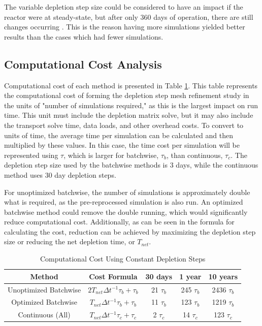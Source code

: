 The variable depletion step size could be considered to have an impact if the reactor were at steady-state, but after only 360 days of operation, there are still changes occurring \cite{rykhlevskii_advanced_2018}. This is the reason having more simulations yielded better results than the cases which had fewer simulations.

\subsection{Computational Cost Analysis}

Computational cost of each method is presented in Table \ref{tab:comp-cost-methods-1}.
This table represents the computational cost of forming the depletion step mesh refinement study in the units of "number of simulations required," as this is the largest impact on run time. This unit must include the depletion matrix solve, but it may also include the transport solve time, data loads, and other overhead costs. To convert to units of time, the average time per simulation can be calculated and then multiplied by these values. In this case, the time cost per simulation will be represented using $\tau$, which is larger for batchwise, $\tau_{b}$, than continuous, $\tau_{c}$.
The depletion step size used by the batchwise methods is 3 days, while the continuous method uses 30 day depletion steps.

For unoptimized batchwise, the number of simulations is approximately double what is required, as the pre-reprocessed simulation is also run. An optimized batchwise method could remove the double running, which would significantly reduce computational cost. Additionally, as can be seen in the formula for calculating the cost, reduction can be achieved by maximizing the depletion step size or reducing the net depletion time, or $T_{net}$.

\begin{table}[H]
\renewcommand{\arraystretch}{1.25}
\caption{Computational Cost Using Constant Depletion Steps}
\label{tab:comp-cost-methods-1}
\begin{center}
\begin{tabular}{ c | c | c | c | c }
 \hline
 Method & Cost Formula & 30 days & 1 year & 10 years\\
 \hline
 \hline
 Unoptimized Batchwise & $2 T_{net} \Delta t^{-1} \tau_{b} + \tau_{b}$ & 21 $\tau_{b}$ & 245 $\tau_{b}$ & 2436 $\tau_{b}$ \\
 Optimized Batchwise & $T_{net} \Delta t^{-1} \tau_{b} + \tau_{b}$ & 11 $\tau_{b}$ & 123 $\tau_{b}$ & 1219 $\tau_{b}$\\
 Continuous (All) & $T_{net} \Delta t^{-1} \tau_{c} + \tau_{c}$ & 2 $\tau_{c}$ & 14 $\tau_{c}$ & 123 $\tau_{c}$\\
 \hline
\end{tabular}
\end{center}
\end{table}

